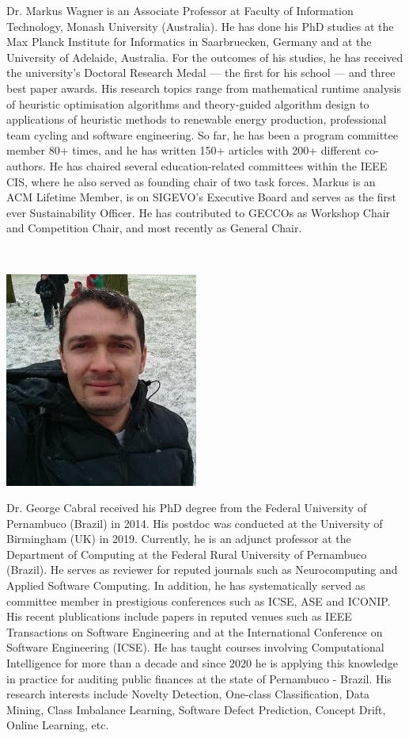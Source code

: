 Dr. Markus Wagner is an Associate Professor at Faculty of Information Technology, Monash University (Australia). He has done his PhD studies at the Max Planck Institute for Informatics in Saarbruecken, Germany and at the University of Adelaide, Australia. For the outcomes of his studies, he has received the university's Doctoral Research Medal --- the first for his school --- and three best paper awards. His research topics range from mathematical runtime analysis of heuristic optimisation algorithms and theory-guided algorithm design to applications of heuristic methods to renewable energy production, professional team cycling and software engineering. So far, he has been a program committee member 80+ times, and he has written 150+ articles with 200+ different co-authors. He has chaired several education-related committees within the IEEE CIS, where he also served as founding chair of two task forces. Markus is an ACM Lifetime Member, is on SIGEVO's Executive Board and serves as the first ever Sustainability Officer. He has contributed to GECCOs as Workshop Chair and Competition Chair, and most recently as General Chair.

\newpage
\

\vspace{3cm}
\begin{center}
\includegraphics[width=.3\textwidth]{Photos/cabral.jpg}
\end{center}

Dr. George Cabral received his PhD degree from the Federal University of Pernambuco (Brazil) in 2014. His postdoc was conducted at the University of Birmingham (UK) in 2019. Currently, he is an adjunct professor at the Department of Computing at the Federal Rural University of Pernambuco (Brazil). He serves as reviewer for reputed journals such as Neurocomputing and Applied Software Computing. In addition, he has systematically served as committee member in prestigious conferences such as ICSE, ASE and ICONIP. His recent plublications include papers in reputed venues such as IEEE Transactions on Software Engineering and at the International Conference on Software Engineering (ICSE). He has taught courses involving Computational Intelligence for more than a decade and since 2020 he is applying this knowledge in practice for auditing public finances at the state of Pernambuco - Brazil. His research interests include Novelty Detection, One-class Classification, Data Mining, Class Imbalance Learning, Software Defect Prediction, Concept Drift, Online Learning, etc.

